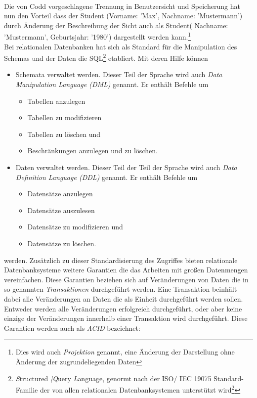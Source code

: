 \\Die von Codd vorgeschlagene Trennung in Benutzersicht und Speicherung hat nun den Vorteil dass der Student (Vorname: 'Max', Nachname: 'Mustermann') durch Änderung der Beschreibung der Sicht auch als Student( Nachname: 'Mustermann', Geburtsjahr: '1980') dargestellt werden kann.\footnote{Dies wird auch \emph{Projektion} genannt, eine Änderung der Darstellung ohne Änderung der zugrundeliegenden Daten\parencite[S. 152]{dbgrund} }
\\Bei relationalen Datenbanken hat sich als Standard für die Manipulation des Schemas und der Daten die SQL\footnote{\emph{S}tructured \emph{[Q}uery \emph{L}anguage, genormt nach der ISO/ IEC 19075 Standard-Familie der von allen relationalen Datenbanksystemen unterstützt wird\parencite{ocl_sql}\parencite{isosql}\footnote{Jeweils mit eigenen, unterschiedlich mächtigen Erweiterungen um den Anwendungsentwicklern einen Austausch des zugrundeliegenden Systems zu erschweren}} etabliert. Mit deren Hilfe können\parencite[S. 182]{dbgrund}
\begin{itemize}
	\item Schemata verwaltet werden. Dieser Teil der Sprache wird auch \emph{Data Manipulation Language (DML)} genannt. Er enthält Befehle um 
	\begin{itemize}
		\item Tabellen anzulegen
		\item Tabellen zu modifizieren
		\item Tabellen zu löschen und
		\item Beschränkungen anzulegen und zu löschen.
	\end{itemize}
	\item Daten verwaltet werden. Dieser Teil der Teil der Sprache wird auch \emph{Data Definition Language (DDL)} genannt. Er enthält Befehle um
	\begin{itemize}
		\item Datensätze anzulegen
		\item Datensätze auszulesen
		\item Datensätze zu modifizieren und
		\item Datensätze zu löschen.
	\end{itemize}
\end{itemize} werden.
Zusätzlich zu dieser Standardisierung des Zugriffes bieten relationale Datenbanksysteme weitere Garantien die das Arbeiten mit großen Datenmengen vereinfachen. Diese Garantien beziehen sich auf Veränderungen von Daten die in so genannten \emph{Transaktionen} durchgeführt werden. Eine Transaktion beinhält dabei alle Veränderungen an Daten die als Einheit durchgeführt werden sollen. Entweder werden alle Veränderungen erfolgreich durchgeführt, oder aber keine einzige der Veränderungen innerhalb einer Transaktion wird durchgeführt. Diese Garantien werden auch als \emph{ACID} bezeichnet:\parencite[S. 6fs]{GrayReuter93}\parencite[S. 23ff]{WeikumVossen02}
